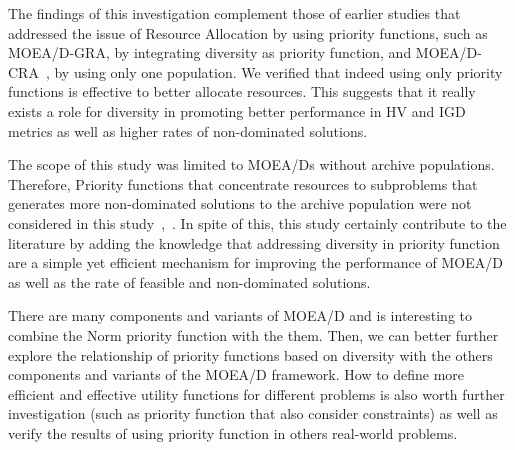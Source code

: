  
 The findings of this investigation complement those of earlier studies that addressed the issue of Resource Allocation by using priority functions, such as MOEA/D-GRA\cite{zhou2016all}, by integrating diversity as priority function, and MOEA/D-CRA~\cite{kang2018collaborative}, by using only one population. We verified that indeed using only priority functions is effective to better allocate resources. This suggests that it really exists a role for diversity in promoting better performance in HV and IGD metrics as well as higher rates of non-dominated solutions.




The scope of this study was limited to MOEA/Ds without archive populations. Therefore, Priority functions that concentrate resources to subproblems that generates more non-dominated solutions to the archive population were not considered in this study~\cite{cai2015external},~\cite{kang2018collaborative}. In spite of this, this study certainly contribute to the literature by adding the knowledge that addressing diversity in priority function are a simple yet efficient mechanism for improving the performance of MOEA/D as well as the rate of feasible and non-dominated solutions. 



There are many components and variants of MOEA/D and is interesting to combine the Norm priority function with the them. Then, we can better further explore the relationship of priority functions based on diversity with the others components and variants of the MOEA/D framework. How to define more efficient and effective utility functions for different problems is also worth further investigation (such as priority function that also consider constraints) as well as verify the results of using priority function in others real-world problems.
%
